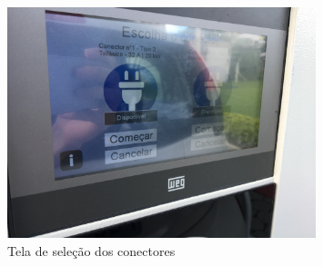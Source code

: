     \begin{figure}[H]
      \begin{center}
        \includegraphics[width=0.8\textwidth,natwidth=1420,natheight=2130]{assets/images/evse-show3.jpg}
        \caption{Tela de seleção dos conectores}
        \label{fig:evse-show3}
      \end{center}
    \end{figure}